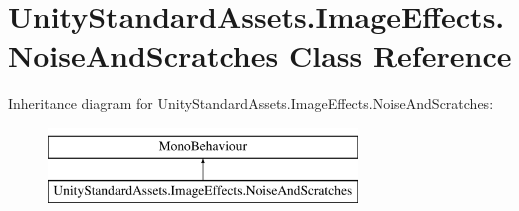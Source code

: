 \hypertarget{class_unity_standard_assets_1_1_image_effects_1_1_noise_and_scratches}{}\section{Unity\+Standard\+Assets.\+Image\+Effects.\+Noise\+And\+Scratches Class Reference}
\label{class_unity_standard_assets_1_1_image_effects_1_1_noise_and_scratches}
Inheritance diagram for Unity\+Standard\+Assets.\+Image\+Effects.\+Noise\+And\+Scratches\+:\begin{figure}[H]
\begin{center}
\leavevmode
\includegraphics[height=2.000000cm]{class_unity_standard_assets_1_1_image_effects_1_1_noise_and_scratches}
\end{center}
\end{figure}

